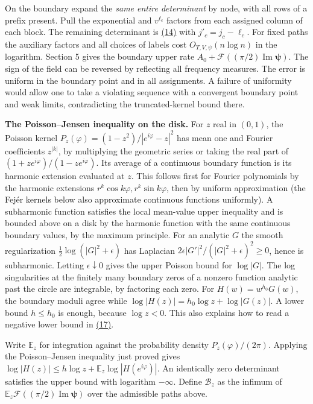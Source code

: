 \documentclass[11pt,a4paper]{article}
\begin{document}
On the boundary expand the \emph{same entire determinant} by node, with all rows of a prefix present. Pull the exponential and \(v^{\ell_c}\) factors from each assigned column of each block. The remaining determinant is \hyperref[eq:14]{(14)} with \(j'_c=j_c-\ell_c\). For fixed paths the auxiliary factors and all choices of labels cost \(O_{T,V,\psi}(n\log n)\) in the logarithm. Section 5 gives the boundary upper rate \(A_0+\mathcal F((\pi/2)\operatorname{Im}\boldsymbol\psi)\). The sign of the field can be reversed by reflecting all frequency measures. The error is uniform in the boundary point and in all assignments. A failure of uniformity would allow one to take a violating sequence with a convergent boundary point and weak limits, contradicting the truncated-kernel bound there.

\textbf{The Poisson--Jensen inequality on the disk.} For \(z\) real in \((0,1)\), the Poisson kernel \(P_z(\varphi)=(1-z^2)/|e^{i\varphi}-z|^2\) has mean one and Fourier coefficients \(z^{|k|}\), by multiplying the geometric series or taking the real part of \((1+ze^{i\varphi})/(1-ze^{i\varphi})\). Its average of a continuous boundary function is its harmonic extension evaluated at \(z\). This follows first for Fourier polynomials by the harmonic extensions \(r^k\cos k\varphi,r^k\sin k\varphi\), then by uniform approximation (the Fejér kernels below also approximate continuous functions uniformly). A subharmonic function satisfies the local mean-value upper inequality and is bounded above on a disk by the harmonic function with the same continuous boundary values, by the maximum principle. For an analytic \(G\) the smooth regularization \(\frac12\log(|G|^2+\epsilon)\) has Laplacian \(2\epsilon |G'|^2/(|G|^2+\epsilon)^2\ge0\), hence is subharmonic. Letting \(\epsilon\downarrow0\) gives the upper Poisson bound for \(\log|G|\). The log singularities at the finitely many boundary zeros of a nonzero function analytic past the circle are integrable, by factoring each zero. For \(H(w)=w^{h_0}G(w)\), the boundary moduli agree while \(\log|H(z)|=h_0\log z+\log|G(z)|\). A lower bound \(h\le h_0\) is enough, because \(\log z<0\). This also explains how to read a negative lower bound in \hyperref[eq:17]{(17)}.

Write \(\mathbb E_z\) for integration against the probability density \(P_z(\varphi)/(2\pi)\). Applying the Poisson--Jensen inequality just proved gives \(\log|H(z)|\le h\log z+\mathbb E_z\log|H(e^{i\varphi})|\). An identically zero determinant satisfies the upper bound with logarithm \(-\infty\). Define \(\mathcal B_z\) as the infimum of \(\mathbb E_z\mathcal F((\pi/2)\operatorname{Im}\boldsymbol\psi)\) over the admissible paths above.
\end{document}
